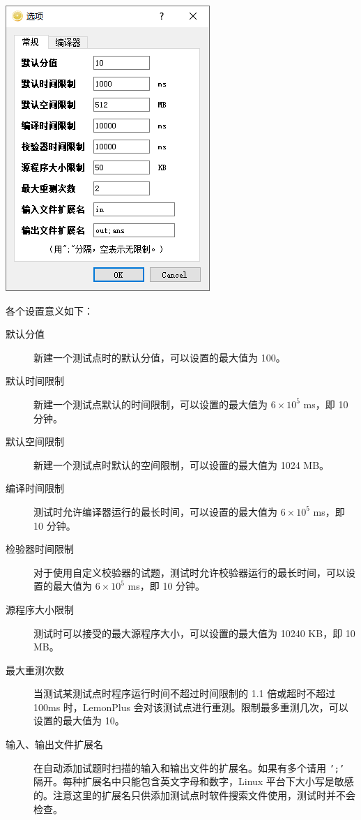 \documentclass[12pt, a4paper]{article}
\begin{document}
\begin{center}
\includegraphics[scale=0.7]{pic/generalsettings.png}
\end{center}

各个设置意义如下：

\begin{description}
\item[默认分值] 新建一个测试点时的默认分值，可以设置的最大值为 100。
\item[默认时间限制] 新建一个测试点默认的时间限制，可以设置的最大值为 $6 \times 10^5$ ms，即 10 分钟。
\item[默认空间限制] 新建一个测试点时默认的空间限制，可以设置的最大值为 1024 MB。
\item[编译时间限制] 测试时允许编译器运行的最长时间，可以设置的最大值为 $6 \times 10^5$ ms，即 10 分钟。
\item[检验器时间限制] 对于使用自定义校验器的试题，测试时允许校验器运行的最长时间，可以设置的最大值为 $6 \times 10^5$ ms，即 10 分钟。
\item[源程序大小限制] 测试时可以接受的最大源程序大小，可以设置的最大值为 10240 KB，即 10 MB。
\item[最大重测次数] 当测试某测试点时程序运行时间不超过时间限制的 1.1 倍或超时不超过 100ms 时，LemonPlus 会对该测试点进行重测。限制最多重测几次，可以设置的最大值为 10。
\item[输入、输出文件扩展名]  在自动添加试题时扫描的输入和输出文件的扩展名。如果有多个请用 \texttt{';'} 隔开。每种扩展名中只能包含英文字母和数字，Linux 平台下大小写是敏感的。注意这里的扩展名只供添加测试点时软件搜索文件使用，测试时并不会检查。
\end{description}
\end{document}
